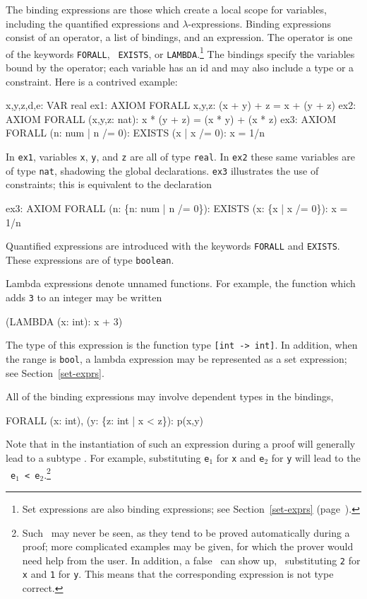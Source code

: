 The binding expressions are those which create a local scope for
variables, including the quantified expressions and
$\lambda$-expressions.  Binding expressions consist of an operator, a
list of bindings, and an expression.  The operator is one of the
keywords \texttt{FORALL}, \texttt{
EXISTS}, or \texttt{LAMBDA}.\footnote{Set
expressions are also binding expressions; see Section~\ref{set-exprs} (page~\pageref{set-exprs}).}
The bindings specify the variables bound by the operator; each variable
has an id and may also include a type or a constraint.  Here is a
contrived example:
\begin{pvsex}
  x,y,z,d,e: VAR real
  ex1: AXIOM FORALL x,y,z: (x + y) + z = x + (y + z)
  ex2: AXIOM FORALL (x,y,z: nat): x * (y + z) = (x * y) + (x * z)
  ex3: AXIOM FORALL (n: num | n /= 0): EXISTS (x | x /= 0): x = 1/n
\end{pvsex}
%
In \texttt{ex1}, variables \texttt{x}, \texttt{y}, and \texttt{z} are all of type
\texttt{real}.  In \texttt{ex2} these same variables are of type \texttt{nat},
shadowing the global declarations.  \texttt{ex3} illustrates
the use of constraints; this is equivalent to the declaration
\begin{pvsex}
  ex3: AXIOM FORALL (n: \{n: num | n /= 0\}):
               EXISTS (x: \{x | x /= 0\}): x = 1/n
\end{pvsex}

Quantified expressions are introduced with
the keywords \texttt{FORALL} and \texttt{EXISTS}.  These expressions are of type
\texttt{boolean}.

Lambda expressions denote unnamed functions.
For example, the function which adds \texttt{3} to an integer may be
written
\begin{pvsex}
  (LAMBDA (x: int): x + 3)
\end{pvsex}
%
The type of this expression is the function type \texttt{[int -> int]}.
In addition, when the
range is \texttt{bool}, a lambda expression may be represented as a set
expression; see Section~\ref{set-exprs}.

All of the binding expressions may involve dependent
types in the bindings, \eg
\begin{pvsex}
  FORALL (x: int), (y: \{z: int | x < z\}): p(x,y)
\end{pvsex}
%
Note that in the instantiation of such an expression during a proof will
generally lead to a subtype \tcc.  For example, substituting \texttt{e$_1$} for
\texttt{x} and \texttt{e$_2$} for \texttt{y} will lead to the \tcc\ \texttt{e$_1$ <
e$_2$}.\footnote{Such \tccs\ may never be seen, as they tend to be
proved automatically during a proof; more complicated examples may be
given, for which the prover would need help from the user.  In addition,
a false \tcc\ can show up, \eg\ substituting \texttt{2} for \texttt{x} and
\texttt{1} for \texttt{y}.  This means that the corresponding expression is
not type correct.}

